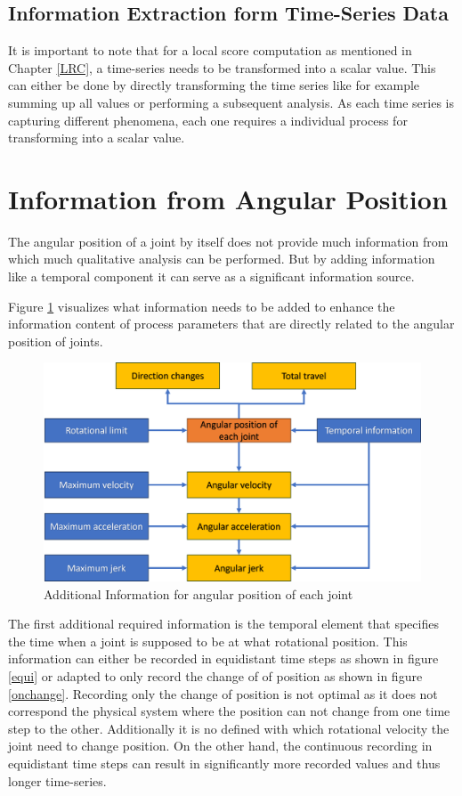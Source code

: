  
\subsection{Information Extraction form Time-Series Data}\label{extraction}
It is important to note that for a local score computation as mentioned in Chapter \ref{LRC}, a time-series needs to be transformed into a scalar value. This can either be done by directly transforming the time series like for example summing up all values or performing a subsequent analysis. As each time series is capturing different phenomena, each one requires a individual process for transforming into a scalar value.

\section{Information from Angular Position}
The angular position of a joint by itself does not provide much information from which much qualitative analysis can be performed. But by adding information like a temporal component it can serve as a significant information source. 

Figure \ref{agularstuff} visualizes what information needs to be added to enhance the information content of process parameters that are directly related to the angular position of joints.

\begin{figure}[H]
	\centerline{\includegraphics[scale=.55]{figures/angularstuff.png}}
	\caption{Additional Information for angular position of each joint}
	\label{agularstuff}
\end{figure}



The first additional required information is the temporal element that specifies the time when a joint is supposed to be at what rotational position. This information can either be recorded in equidistant time steps as shown in figure \ref{equi} or adapted to only record the change of of position as shown in figure \ref{onchange}. Recording only the change of position is not optimal as it does not correspond the physical system where the position can not change from one time step to the other. Additionally it is no defined with which rotational velocity the joint need to change position. On the other hand, the continuous recording in equidistant time steps can result in significantly more recorded values and thus longer time-series.

